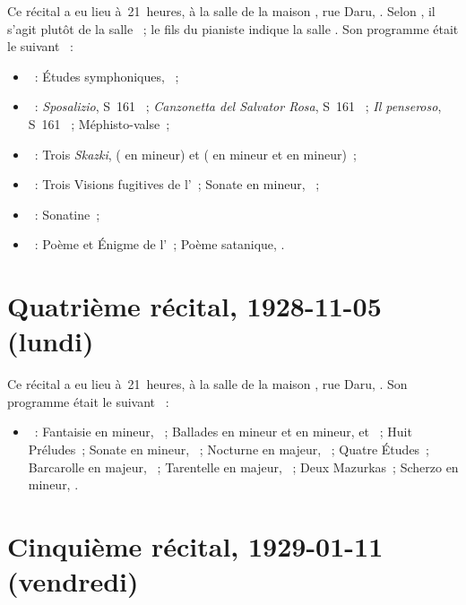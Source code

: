 Ce récital a eu lieu à~21~heures, à la salle \Chopin{} de la maison
\Pleyel{}, rue Daru, .
Selon \citet[p.~401]{Scriabine}, il s'agit plutôt de la salle \Debussy{}~;
le fils du pianiste indique la salle \Chopin{}.
Son programme était le suivant \citep[voir][]{Nekrasova08, Semaine334b,
Semaine335, White}~:
\begin{itemize}
 \item
 \Schumann{}~: Études symphoniques, ~;
 \item
 \Liszt{}~: \emph{Sposalizio}, S~161 ~; \emph{Canzonetta del
 Salvator Rosa}, S~161 ~; \emph{Il penseroso}, S~161 ~;
 Méphisto-valse~;
 \item
 \Medtner{}~: Trois \emph{Skazki},  ( en \kF mineur) et
  ( en \kB \Flat mineur et  en \kB mineur)~;
 \item
 \Prokofiev{}~: Trois Visions fugitives de l'~; Sonate 
 en \kA mineur, ~;
 \item
 \Ravel{}~: Sonatine~;
 \item
 \Scriabine{}~: Poème et Énigme de l'~; Poème satanique, .
\end{itemize}

\section{Quatrième récital, 1928-11-05 (lundi)}
\label{rec:Paris4}

Ce récital a eu lieu à~21~heures, à la salle \Chopin{} de la maison
\Pleyel{}, rue Daru, .
Son programme était le suivant \citep[voir][]{Nekrasova08, Semaine334b,
Semaine335, White}~:
\begin{itemize}
 \item
 \Chopin{}~: Fantaisie en \kF mineur, ~; Ballades en \kG mineur et
 en \kF mineur,  et ~; Huit Préludes~; Sonate en \kB
 mineur, ~; Nocturne en \kF majeur,  ~; Quatre
 Études~; Barcarolle en \kF \Sharp majeur, ~; Tarentelle en \kA
 \Flat majeur, ~; Deux Mazurkas~; Scherzo en \kB mineur, .
\end{itemize}

\section{Cinquième récital, 1929-01-11 (vendredi)}
\label{rec:Paris5}

